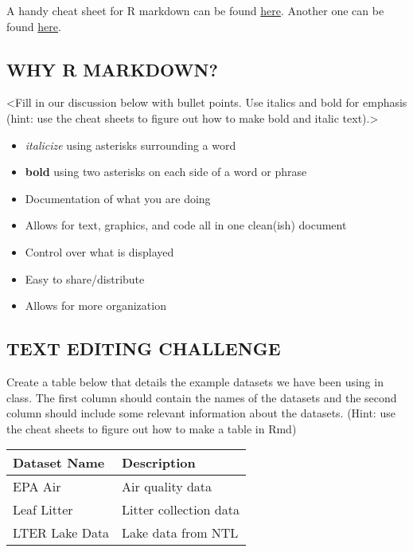\documentclass[
]{article}
\providecommand{\tightlist}{%
  \setlength{\itemsep}{0pt}\setlength{\parskip}{0pt}}
\begin{document}
A handy cheat sheet for R markdown can be found
\href{https://www.rstudio.com/wp-content/uploads/2015/03/rmarkdown-reference.pdf}{here}.
Another one can be found
\href{https://www.rstudio.com/wp-content/uploads/2015/02/rmarkdown-cheatsheet.pdf}{here}.

\hypertarget{why-r-markdown}{%
\subsection{WHY R MARKDOWN?}\label{why-r-markdown}}

\textless Fill in our discussion below with bullet points. Use italics
and bold for emphasis (hint: use the cheat sheets to figure out how to
make bold and italic text).\textgreater{}

\begin{itemize}
\tightlist
\item
  \emph{italicize} using asterisks surrounding a word
\item
  \textbf{bold} using two asterisks on each side of a word or phrase
\item
  Documentation of what you are doing
\item
  Allows for text, graphics, and code all in one clean(ish) document
\item
  Control over what is displayed
\item
  Easy to share/distribute
\item
  Allows for more organization
\end{itemize}

\hypertarget{text-editing-challenge}{%
\subsection{TEXT EDITING CHALLENGE}\label{text-editing-challenge}}

Create a table below that details the example datasets we have been
using in class. The first column should contain the names of the
datasets and the second column should include some relevant information
about the datasets. (Hint: use the cheat sheets to figure out how to
make a table in Rmd)

\begin{longtable}[]{@{}ll@{}}
\toprule
Dataset Name & Description\tabularnewline
\midrule
\endhead
EPA Air & Air quality data\tabularnewline
Leaf Litter & Litter collection data\tabularnewline
LTER Lake Data & Lake data from NTL\tabularnewline
\bottomrule
\end{longtable}
\end{document}
